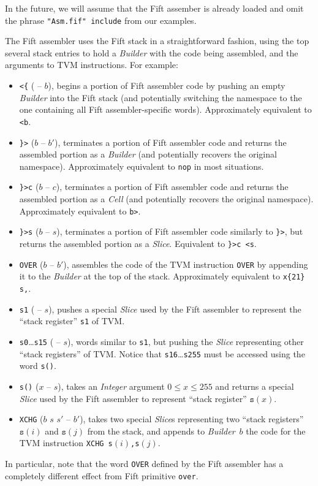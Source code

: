 \documentclass[12pt,oneside]{article}
\begin{document}
In the future, we will assume that the Fift assember is already loaded and omit the phrase {\tt "Asm.fif" include} from our examples.

The Fift assembler uses the Fift stack in a straightforward fashion, using the top several stack entries to hold a {\em Builder\/} with the code being assembled, and the arguments to TVM instructions. For example:
\begin{itemize}
\item {\tt <\{} ( -- $b$), begins a portion of Fift assembler code by pushing an empty {\em Builder\/} into the Fift stack (and potentially switching the namespace to the one containing all Fift assembler-specific words). Approximately equivalent to {\tt <b}.
\item {\tt \}>} ($b$ -- $b'$), terminates a portion of Fift assembler code and returns the assembled portion as a {\em Builder\/} (and potentially recovers the original namespace). Approximately equivalent to {\tt nop} in most situations.
\item {\tt \}>c} ($b$ -- $c$), terminates a portion of Fift assembler code and returns the assembled portion as a {\em Cell\/} (and potentially recovers the original namespace). Approximately equivalent to {\tt b>}.
\item {\tt \}>s} ($b$ -- $s$), terminates a portion of Fift assembler code similarly to {\tt \}>}, but returns the assembled portion as a {\em Slice\/}. Equivalent to {\tt \}>c <s}.
\item {\tt OVER} ($b$ -- $b'$), assembles the code of the TVM instruction {\tt OVER} by appending it to the {\em Builder\/} at the top of the stack. Approximately equivalent to {\tt x\{21\} s,}.
\item {\tt s1} ( -- $s$), pushes a special {\em Slice\/} used by the Fift assembler to represent the ``stack register'' {\tt s1} of TVM.
\item {\tt s0}\dots{\tt s15} ( -- $s$), words similar to {\tt s1}, but pushing the {\em Slice\/} representing other ``stack registers'' of TVM. Notice that {\tt s16}\dots{\tt s255} must be accessed using the word {\tt s()}.
\item {\tt s()} ($x$ -- $s$), takes an {\em Integer\/} argument $0\leq x\leq 255$ and returns a special {\em Slice\/} used by the Fift assembler to represent ``stack register'' ${\texttt s}(x)$.
\item {\tt XCHG} ($b$ $s$ $s'$ -- $b'$), takes two special {\em Slice\/}s representing two ``stack registers'' ${\texttt s}(i)$ and ${\texttt s}(j)$ from the stack, and appends to {\em Builder\/}~$b$ the code for the TVM instruction {\tt XCHG s$(i)$,s$(j)$}.
\end{itemize}
In particular, note that the word {\tt OVER} defined by the Fift assembler has a completely different effect from Fift primitive {\tt over}.
\end{document}
